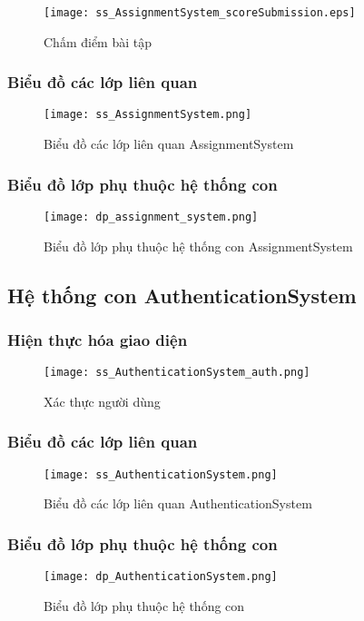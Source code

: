 \documentclass[./../main.tex]{subfiles}
\begin{document}
\begin{figure}[H]
    \centering
    \texttt{[image: ss\_AssignmentSystem\_scoreSubmission.eps]}
    \caption{Chấm điểm bài tập}
    \label{ss_as_ss}
\end{figure}
\subsubsection{Biểu đồ các lớp liên quan}
\begin{figure}[H]
    \centering
    \texttt{[image: ss\_AssignmentSystem.png]}
    \caption{Biểu đồ các lớp liên quan AssignmentSystem}
    \label{ss_as}
\end{figure}
\subsubsection{Biểu đồ lớp phụ thuộc hệ thống con}
\begin{figure}[H]
    \centering
    \texttt{[image: dp\_assignment\_system.png]}
    \caption{Biểu đồ lớp phụ thuộc hệ thống con AssignmentSystem}
    \label{dp_as}
\end{figure}

\subsection{Hệ thống con AuthenticationSystem}
\subsubsection{Hiện thực hóa giao diện}
\begin{figure}[H]
    \centering
    \texttt{[image: ss\_AuthenticationSystem\_auth.png]}
    \caption{Xác thực người dùng}
    \label{ss_aus_a}
\end{figure}
\subsubsection{Biểu đồ các lớp liên quan}
\begin{figure}[H]
    \centering
    \texttt{[image: ss\_AuthenticationSystem.png]}
    \caption{Biểu đồ các lớp liên quan AuthenticationSystem}
    \label{ss_aus}
\end{figure}
\subsubsection{Biểu đồ lớp phụ thuộc hệ thống con}
\begin{figure}[H]
    \centering
    \texttt{[image: dp\_AuthenticationSystem.png]}
    \caption{Biểu đồ lớp phụ thuộc hệ thống con}
    \label{dp_aus}
\end{figure}
\end{document}
